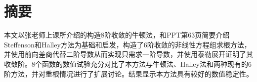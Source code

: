 
\section*{摘要}

本文以张老师上课所介绍的构造8阶收敛的牛顿法，和PPT第63页简要介绍Steffenson和Halley方法为基础和启发，构造了6阶收敛的非线性方程组求根方法，并使用前向差商代替二阶导数从而实现只需求一阶导数，并使用泰勒展开证明了其收敛阶。8个函数的数值试验充分对比了本方法与牛顿法、Halley法和两种现有的6阶方法，并对重根情况进行了扩展讨论。结果显示本方法具有较好的数值稳定性。



